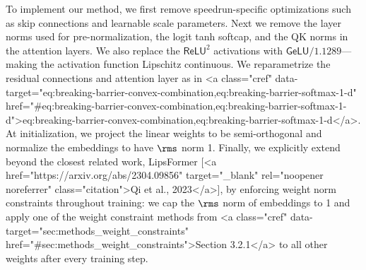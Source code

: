 To implement our method, we first remove speedrun-specific optimizations such as skip connections and learnable scale parameters. Next we remove the layer norms used for pre-normalization, the logit tanh softcap, and the QK norms in the attention layers. We also replace the $\mathsf{ReLU}^2$ activations with $\mathsf{GeLU}/1.1289$---making the activation function Lipschitz continuous. We reparametrize the residual connections and attention layer as in <a class="cref" data-target="eq:breaking-barrier-convex-combination,eq:breaking-barrier-softmax-1-d" href="#eq:breaking-barrier-convex-combination,eq:breaking-barrier-softmax-1-d">eq:breaking-barrier-convex-combination,eq:breaking-barrier-softmax-1-d</a>. At initialization, we project the linear weights to be semi-orthogonal and normalize the embeddings to have $\rms$ norm 1. Finally, we explicitly extend beyond the closest related work, LipsFormer [<a href="https://arxiv.org/abs/2304.09856" target="_blank" rel="noopener noreferrer" class="citation">Qi et al., 2023</a>], by enforcing weight norm constraints throughout training: we cap the $\rms$ norm of embeddings to 1 and apply one of the weight constraint methods from <a class="cref" data-target="sec:methods_weight_constraints" href="#sec:methods_weight_constraints">Section 3.2.1</a> to all other weights after every training step.

